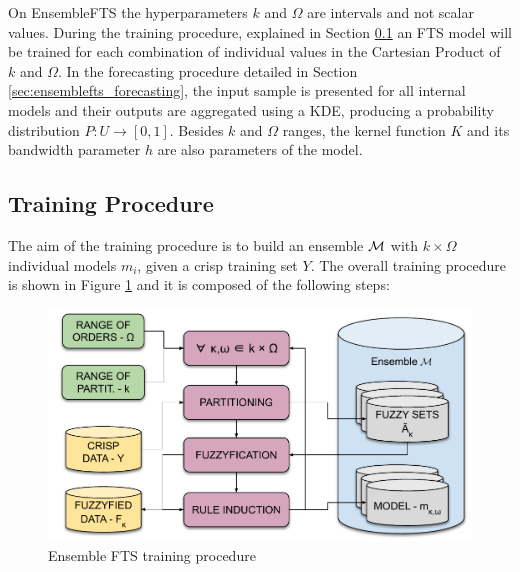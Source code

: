 On EnsembleFTS the hyperparameters $k$ and $\Omega$ are intervals and not scalar values. During the training procedure, explained in Section \ref{sec:ensemblefts_training} an FTS model will be trained for each combination of individual values in the Cartesian Product of $k$ and $\Omega$. In the forecasting procedure detailed in Section \ref{sec:ensemblefts_forecasting}, the input sample is presented for all internal models and their outputs are aggregated using a KDE, producing a probability distribution $P:U \rightarrow [0,1]$. Besides $k$ and $\Omega$ ranges, the kernel function $K$ and its bandwidth parameter $h$ are also parameters of the model.

%
\subsection{Training Procedure}
\label{sec:ensemblefts_training}

The aim of the training procedure is to build an ensemble $\mathcal{M}$ with $k\times\Omega$ individual models $m_i$, given a crisp training set $Y$. The overall training procedure is shown in Figure \ref{fig:ensemblefts_training} and it is composed of the following steps:

\begin{figure}[htb]
\includegraphics[width=\textwidth]{figures/ensemblefts_training.pdf}
\caption{Ensemble FTS training procedure}
\label{fig:ensemblefts_training}
\end{figure}

